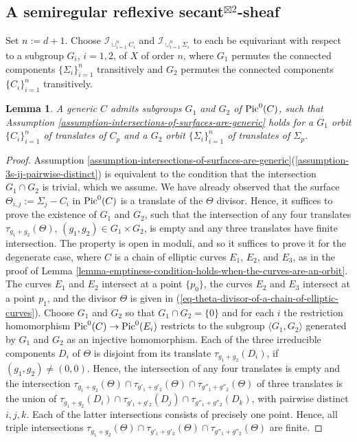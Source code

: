 \documentclass[12pt]{amsart}
\numberwithin{equation}{subsection}
\theoremstyle{plain}
\newtheorem{lem}[thm]{Lemma}
\theoremstyle{definition}
\newcommand{\Pic}{{\rm Pic}}
\newcommand{\Ideal}[1]{{\mathcal I}_{#1}}
\begin{document}
% 
\subsection{A semiregular reflexive secant$^{\boxtimes 2}$-sheaf}
\label{subsection-a-semiregular-secant-square-sheaf}
Set $n:=d+1$.
Choose $\Ideal{\cup_{i=1}^n C_i}$ and 
$\Ideal{\cup_{i=1}^n\Sigma_i}$ to each be equivariant with respect to a subgroup $G_i$, $i=1,2$, of $X$ of order $n$, where $G_1$ permutes the connected components $\{\Sigma_i\}_{i=1}^n$ transitively and $G_2$ 
permutes the connected components $\{C_i\}_{i=1}^n$ transitively. 

\begin{lem}
\label{lemma-G_1-and-G_2-can-be-chosen-to-satisfy-assumption-intersections-of-surfaces-are-generic}
A generic $C$ admits subgroups $G_1$ and $G_2$ of $\Pic^0(C)$, such that Assumption \ref{assumption-intersections-of-surfaces-are-generic} holds for a $G_1$ orbit $\{C_i\}_{i=1}^n$ of translates of $C_p$ and a $G_2$ orbit $\{\Sigma_i\}_{i=1}^n$ of translates of $\Sigma_p$.
\end{lem}

\begin{proof}
Assumption \ref{assumption-intersections-of-surfaces-are-generic}(\ref{assumption-3s-ij-pairwise-distinct}) is equivalent to the condition that the intersection $G_1\cap G_2$ is trivial, which we assume.
We have already observed that the surface $\Theta_{i,j}:=\Sigma_j-C_i$ in $\Pic^0(C)$ is a translate of the $\Theta$ divisor. Hence, it suffices to prove the existence of $G_1$ and $G_2$, such that the intersection of any four translates
$\tau_{g_1+g_2}(\Theta)$, $(g_1,g_2)\in G_1\times G_2$, is empty and any three translates have finite intersection. The property is open in moduli, and so it suffices to prove it for the degenerate case, where $C$ is a chain of elliptic curves $E_1$, $E_2$, and $E_3$, as in the proof of Lemma \ref{lemma-emptiness-condition-holds-when-the-curves-are-an-orbit}. The curves $E_1$ and $E_2$ intersect at a point $\{p_0\}$, the curves $E_2$ and $E_3$ intersect at a point $p_1$, and the divisor $\Theta$ is  given in (\ref{eq-theta-divisor-of-a-chain-of-elliptic-curves}). Choose $G_1$ and $G_2$ so that $G_1\cap G_2=\{0\}$
and for each $i$ the restriction homomorphism $\Pic^0(C)\rightarrow \Pic^0(E_i)$ restricts to the subgroup $\langle G_1, G_2\rangle$ generated by $G_1$ and $G_2$ as an injective homomorphism.
Each of the three irreducible components $D_i$ of $\Theta$ is disjoint from its translate $\tau_{g_1+g_2}(D_i)$, if $(g_1,g_2)\neq(0,0)$. 
Hence, the intersection of any four translates is empty and the intersection $\tau_{g_1+g_2}(\Theta)\cap \tau_{g'_1+g'_2}(\Theta)\cap \tau_{g''_1+g''_2}(\Theta)$ of three translates is the union of
$\tau_{g_1+g_2}(D_i)\cap \tau_{g'_1+g'_2}(D_j)\cap \tau_{g''_1+g''_2}(D_k)$, with pairwise distinct $i, j, k$. Each of the latter intersections consists of precisely one point. Hence, all triple intersections 
$\tau_{g_1+g_2}(\Theta)\cap \tau_{g'_1+g'_2}(\Theta)\cap \tau_{g''_1+g''_2}(\Theta)$
are finite.
\end{proof}
\end{document}
